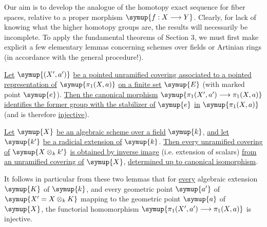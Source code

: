 Our aim is to develop the analogue of the homotopy exact sequence for fiber
spaces, relative to a proper morphism $\symup{f:X\longrightarrow Y}$. Clearly, for lack of
knowing what the higher homotopy groups are, the results will necessarily
be incomplete. To apply the fundamental theorems of Section 3, we must first
make explicit a few elementary lemmas concerning schemes over fields or
Artinian rings (in accordance with the general procedure!).

 \uline{Let} $\symup{(X',a')}$ \uline{be a pointed unramified covering associated to
a pointed representation of} $\symup{\pi_1(X,a)}$ \uline{on a finite set} $\symup{E}$ (with marked
point $\symup{e}$). \uline{Then the canonical morphism}
$\symup{\pi_1(X',a')\longrightarrow\pi_1(X,a)}$ \uline{identifies the former group with the
stabilizer of} $\symup{e}$ \uline{in} $\symup{\pi_1(X,a)}$ (and is therefore \uline{injective}).

 \uline{Let} $\symup{X}$ \uline{be an algebraic scheme over a field} $\symup{k}$, \uline{and let}
$\symup{k'}$ \uline{be a radicial extension of} $\symup{k}$. \uline{Then every unramified covering of}
$\symup{X\otimes_k k'}$ \uline{is obtained by inverse image} (i.e. extension of scalars) \uline{from
an unramified covering of} $\symup{X}$, \uline{determined up to canonical isomorphism}.

It follows in particular from these two lemmas that for \uline{every} algebraic
extension $\symup{K}$ of $\symup{k}$, and every geometric point $\symup{a'}$ of
$\symup{X'=X\otimes_k K}$ mapping to the geometric point $\symup{a}$ of $\symup{X}$, the functorial
homomorphism $\symup{\pi_1(X',a')\longrightarrow\pi_1(X,a)}$ is injective.

